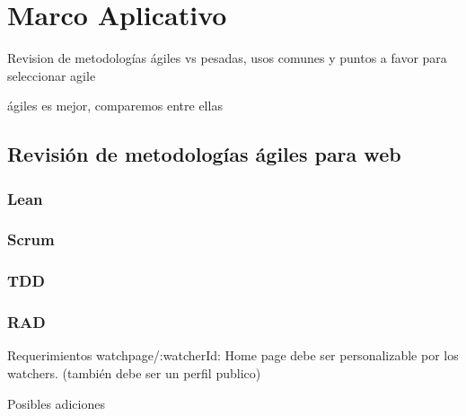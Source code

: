 \section{Marco Aplicativo}

Revision de metodologías ágiles vs pesadas, usos comunes y puntos a favor para seleccionar agile

ágiles es mejor, comparemos entre ellas

\cite{ComparacionFrameworks}
\subsection{Revisión de metodologías ágiles para web }

\subsubsection{Lean}
\subsubsection{Scrum}
\subsubsection{TDD}
\subsubsection{RAD}

Requerimientos
watchpage/:watcherId: Home page debe ser personalizable por los watchers. (también debe ser un perfil publico)


Posibles adiciones

